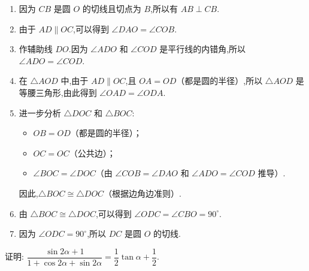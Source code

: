 \begin{questions}
\begin{proofsolution}
\begin{center}
		\end{center}
		\begin{enumerate}[label=\protect\circled{\arabic*}]
			\item 因为 $CB$ 是圆 $O$ 的切线且切点为 $B$,所以有 $AB \perp CB$.
			\item 由于 $AD \parallel OC$,可以得到 $\angle DAO = \angle COB$.
			\item 作辅助线 $DO$.因为 $\angle ADO$ 和 $\angle COD$ 是平行线的内错角,所以 $\angle ADO = \angle COD$.
			\item 在 $\triangle AOD$ 中,由于 $AD \parallel OC$,且 $OA = OD$（都是圆的半径）,所以 $\triangle AOD$ 是等腰三角形,由此得到 $\angle OAD = \angle ODA$.
			\item 进一步分析 $\triangle DOC$ 和 $\triangle BOC$:
			      \begin{itemize}
				      \item $OB = OD$（都是圆的半径）；
				      \item $OC = OC$（公共边）；
				      \item $\angle BOC = \angle DOC$（由 $\angle COB = \angle DAO$ 和 $\angle ADO = \angle COD$ 推导）.
			      \end{itemize}
			      因此,$\triangle BOC \cong \triangle DOC$（根据边角边准则）.
			\item 由 $\triangle BOC \cong \triangle DOC$,可以得到 $\angle ODC = \angle CBO = 90^\circ$.
			\item 因为 $\angle ODC = 90^\circ$,所以 $DC$ 是圆 $O$ 的切线.
		\end{enumerate}
	\end{proofsolution}
	\question[10] 证明: $\dfrac{\sin2\alpha + 1}{1+\cos2\alpha + \sin2\alpha} = \dfrac12\tan\alpha + \dfrac12$.
	\begin{proofsolution}
\end{proofsolution}
\end{questions}
